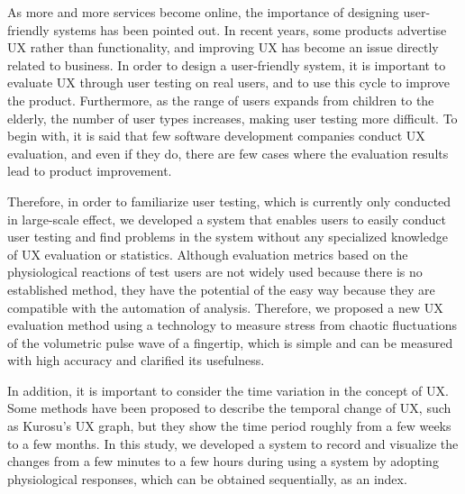 \begin{eabstract}

As more and more services become online, the importance of designing user-friendly systems has been pointed out. In recent years, some products advertise UX rather than functionality, and improving UX has become an issue directly related to business. In order to design a user-friendly system, it is important to evaluate UX through user testing on real users, and to use this cycle to improve the product. Furthermore, as the range of users expands from children to the elderly, the number of user types increases, making user testing more difficult. To begin with, it is said that few software development companies conduct UX evaluation, and even if they do, there are few cases where the evaluation results lead to product improvement.

Therefore, in order to familiarize user testing, which is currently only conducted in large-scale effect, we developed a system that enables users to easily conduct user testing and find problems in the system without any specialized knowledge of UX evaluation or statistics. Although evaluation metrics based on the physiological reactions of test users are not widely used because there is no established method, they have the potential of the easy way because they are compatible with the automation of analysis. Therefore, we proposed a new UX evaluation method using a technology to measure stress from chaotic fluctuations of the volumetric pulse wave of a fingertip, which is simple and can be measured with high accuracy and clarified its usefulness.

In addition, it is important to consider the time variation in the concept of UX. Some methods have been proposed to describe the temporal change of UX, such as Kurosu's UX graph, but they show the time period roughly from a few weeks to a few months. In this study, we developed a system to record and visualize the changes from a few minutes to a few hours during using a system by adopting physiological responses, which can be obtained sequentially, as an index.

\end{eabstract}
